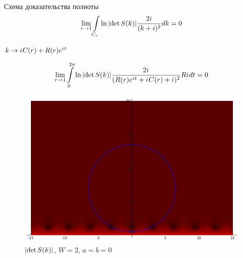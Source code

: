 \documentclass{beamer}
\newcommand{\eexp}[1]{e^{#1}}
\renewcommand{\Im}{\operatorname{Im}}
\begin{document}






\begin{frame}{Схема доказательства полноты}
\[
\lim\limits_{r \to 1} \int\limits_{C_r} \ln \abs{\det S(k)} \frac{2 {i\mkern1mu}}{(k + i)^2} dk = 0
\]

$k \to \iu C(r) + R(r) \eexp{\iu t}$

\[
\lim\limits_{r \to 1} \int\limits_{0}^{2 \pi} \ln \abs{\det S(k)} \frac{2 \iu}{(R(r) \eexp{\iu t} + \iu C(r) + i)^2} R \iu dt = 0
\]
\end{frame}



\begin{frame}[plain]
\begin{figure}
\includegraphics[width=\textwidth,height=\textheight,keepaspectratio]{pic/contour.png}
\caption{$\abs{\det S(k)}$, $W = 2$, $a = b = 0$}
\end{figure}
\end{frame}
\end{document}
